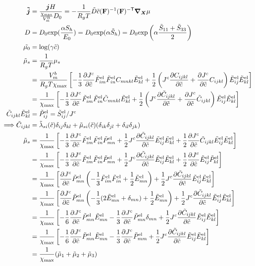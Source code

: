 \begin{align}
    \bm{\td{j}} &= \frac{\bm{j} H}{\cmax D_0} =-\fc{1}{R_g T} \td{D} \tc \inv{\F} \invT{\F} \nablaX \mu \\
    D &= D_0 {\rm{exp}}(\fc{\alpha S_h}{E_0}) = D_0 {\rm{exp}}(\alpha \td{S}_h)= D_0 {\rm{exp}}\left(\alpha \frac{\td{S}_{11}+\td{S}_{33}}{2}\right) \\ 
    \td{\mu_0} &= \text{log}(\gamma \td{c})\\
    \td{\mu}_s &= \frac{1}{R_g T} \mu_s \\
        &= \fc{V_m^b}{R_g T \xmax}\left[-\fc{1}{3}\pdiff{\jc}{\tc}\tFel{im}\tFel{in}{C}_{mnkl}\tEel{kl} + \fc{1}{2}\left(\jc \pdiff{C_{ijkl}}{\tc} + \pdiff{\jc}{\tc} C_{ijkl}\right)\tEel{ij}\tEel{kl}\right] \nonumber \\ 
        &= \fc{1}{\xmax}\left[-\fc{1}{3}\pdiff{\jc}{\tc}\tFel{im}\tFel{in}{\td{C}}_{mnkl}\tEel{kl} + \fc{1}{2}\left(\jc \pdiff{\td{C}_{ijkl}}{\tc} + \pdiff{\jc}{\tc} \td{C}_{ijkl}\right)\tEel{ij}\tEel{kl}\right] \\
    \td{C}_{ijkl} \tEel{kl} &= \tPel{ij}  = \tSel{ij}/\jc \\
    \Longrightarrow \td{C}_{ijkl} &= \td{\lambda}_{si}(\tc)\delta_{ij} \delta_{kl} +  \td{\mu}_{si}(\tc)(\delta_{ik} \delta_{jl} + \delta_{il} \delta_{jk})  \\
    \td{\mu}_s &= \fc{1}{\xmax}\left[-\fc{1}{3}\pdiff{\jc}{\tc}\tFel{im}\tFel{in}\tPel{mn} + \fc{1}{2}\jc \pdiff{\td{C}_{ijkl}}{\tc}\tEel{ij}\tEel{kl} + \fc{1}{2} \pdiff{\jc}{\tc} \td{C}_{ijkl}\tEel{ij}\tEel{kl}\right] \nonumber\\
    &= \fc{1}{\xmax}\left[-\fc{1}{3}\pdiff{\jc}{\tc}\tFel{im}\tFel{in}\tPel{mn} + \fc{1}{2}\jc \pdiff{\td{C}_{ijkl}}{\tc}\tEel{ij}\tEel{kl} + \fc{1}{2} \pdiff{\jc}{\tc} \tEel{ij}\tPel{kl}\right] \nonumber\\
    &= \fc{1}{\xmax}\left[\pdiff{\jc}{\tc} \tPel{mn} \left( -\fc{1}{3}\tFel{im}\tFel{in}+ \fc{1}{2} \tEel{mn}\right)+ \fc{1}{2}\jc \pdiff{\td{C}_{ijkl}}{\tc}\tEel{ij}\tEel{kl} \right] \nonumber\\
    &= \fc{1}{\xmax}\left[\pdiff{\jc}{\tc} \tPel{mn} \left( -\fc{1}{3}(2\tEel{mn}+\delta_{mn})+ \fc{1}{2} \tEel{mn}\right)+ \fc{1}{2}\jc \pdiff{\td{C}_{ijkl}}{\tc}\tEel{ij}\tEel{kl} \right] \nonumber\\
    &= \fc{1}{\xmax}\left[-\fc{1}{6}\pdiff{\jc}{\tc} \tPel{mn} \tEel{mn} - \fc{1}{3}\pdiff{\jc}{\tc} \tPel{mn}\delta_{mn} +  \fc{1}{2}\jc \pdiff{\td{C}_{ijkl}}{\tc}\tEel{ij}\tEel{kl} \right]\nonumber \\
    &= \fc{1}{\xmax}\left[-\fc{1}{6}\pdiff{\jc}{\tc} \tPel{mn} \tEel{mn} - \fc{1}{3 }\pdiff{\jc}{\tc} \tPel{mm} +  \fc{1}{2}\jc \pdiff{\td{C}_{ijkl}}{\tc}\tEel{ij}\tEel{kl} \right] \nonumber\\
    &= \frac{1}{\xmax}(\td{\mu}_1 + \td{\mu}_2 + \td{\mu}_3)
\end{align}



